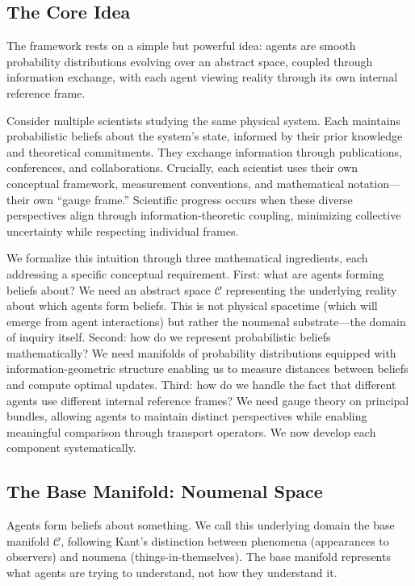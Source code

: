 \documentclass[11pt]{article}
\begin{document}
\subsection{The Core Idea}

The framework rests on a simple but powerful idea: agents are smooth probability distributions evolving over an abstract space, coupled through information exchange, with each agent viewing reality through its own internal reference frame.

Consider multiple scientists studying the same physical system. Each maintains probabilistic beliefs about the system's state, informed by their prior knowledge and theoretical commitments. They exchange information through publications, conferences, and collaborations. Crucially, each scientist uses their own conceptual framework, measurement conventions, and mathematical notation---their own ``gauge frame.'' Scientific progress occurs when these diverse perspectives align through information-theoretic coupling, minimizing collective uncertainty while respecting individual frames.

We formalize this intuition through three mathematical ingredients, each addressing a specific conceptual requirement. First: what are agents forming beliefs about? We need an abstract space $\mathcal{C}$ representing the underlying reality about which agents form beliefs. This is not physical spacetime (which will emerge from agent interactions) but rather the noumenal substrate---the domain of inquiry itself. Second: how do we represent probabilistic beliefs mathematically? We need manifolds of probability distributions equipped with information-geometric structure enabling us to measure distances between beliefs and compute optimal updates. Third: how do we handle the fact that different agents use different internal reference frames? We need gauge theory on principal bundles, allowing agents to maintain distinct perspectives while enabling meaningful comparison through transport operators. We now develop each component systematically.

\subsection{The Base Manifold: Noumenal Space}

Agents form beliefs about something. We call this underlying domain the base manifold $\mathcal{C}$, following Kant's distinction between phenomena (appearances to observers) and noumena (things-in-themselves). The base manifold represents what agents are trying to understand, not how they understand it.
\end{document}
